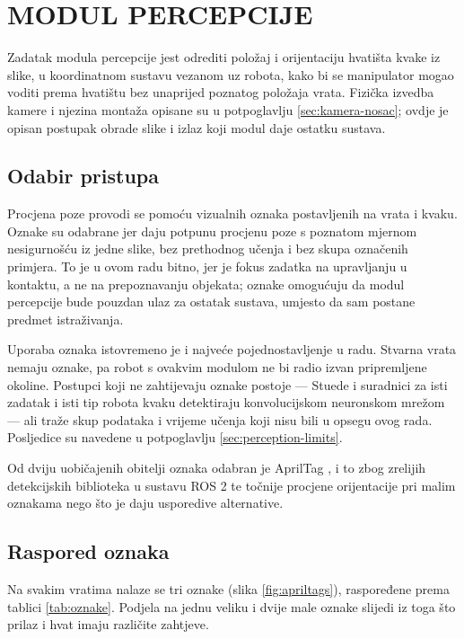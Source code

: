 \chapter{MODUL PERCEPCIJE}
\label{ch:percepcija}

Zadatak modula percepcije jest odrediti položaj i orijentaciju hvatišta kvake iz slike, u
koordinatnom sustavu vezanom uz robota, kako bi se manipulator mogao voditi prema hvatištu bez
unaprijed poznatog položaja vrata. Fizička izvedba kamere i njezina montaža opisane su u
potpoglavlju \ref{sec:kamera-nosac}; ovdje je opisan postupak obrade slike i izlaz koji modul
daje ostatku sustava.

\section{Odabir pristupa}
\label{sec:pristup-percepcija}

Procjena poze provodi se pomoću vizualnih oznaka postavljenih na vrata i kvaku. Oznake su
odabrane jer daju potpunu procjenu poze s poznatom mjernom nesigurnošću iz jedne slike, bez
prethodnog učenja i bez skupa označenih primjera. To je u ovom radu bitno, jer je fokus
zadatka na upravljanju u kontaktu, a ne na prepoznavanju objekata; oznake omogućuju da modul
percepcije bude pouzdan ulaz za ostatak sustava, umjesto da sam postane predmet istraživanja.

Uporaba oznaka istovremeno je i najveće pojednostavljenje u radu. Stvarna vrata nemaju oznake,
pa robot s ovakvim modulom ne bi radio izvan pripremljene okoline. Postupci koji ne zahtijevaju
oznake postoje --- Stuede i suradnici za isti zadatak i isti tip robota kvaku detektiraju
konvolucijskom neuronskom mrežom \cite{stuede2019door} --- ali traže skup podataka i vrijeme
učenja koji nisu bili u opsegu ovog rada. Posljedice su navedene u potpoglavlju
\ref{sec:perception-limits}.

Od dviju uobičajenih obitelji oznaka odabran je AprilTag \cite{olson2011apriltag}, i to zbog
zrelijih detekcijskih biblioteka u sustavu ROS 2 te točnije procjene orijentacije pri malim
oznakama nego što je daju usporedive alternative.

\section{Raspored oznaka}
\label{sec:raspored-oznaka}

Na svakim vratima nalaze se tri oznake (slika \ref{fig:apriltags}), raspoređene prema tablici \ref{tab:oznake}. Podjela na
jednu veliku i dvije male oznake slijedi iz toga što prilaz i hvat imaju različite zahtjeve.

